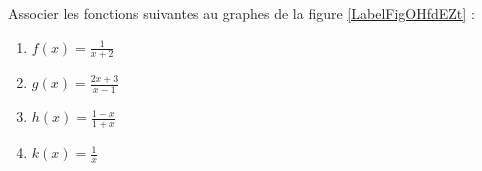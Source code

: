 
\begin{exercice}\label{exosmath-0334}

    Associer les fonctions suivantes au graphes de la figure \ref{LabelFigOHfdEZt} :
    \newcommand{\CaptionFigOHfdEZt}{Les graphes de l'exercice \ref{exosmath-0334}.}


\begin{multicols}{3}
    \begin{enumerate}
        \item
            \( f(x)=\frac{1}{ x+2 }\)
        \item
            \( g(x)=\frac{ 2x+3 }{ x-1 }\)
        \item
            \( h(x)=\frac{ 1-x }{ 1+x }\)
        \item
            \( k(x)=\frac{ 1 }{ x }\)
    \end{enumerate}
\end{multicols}


\end{exercice}
